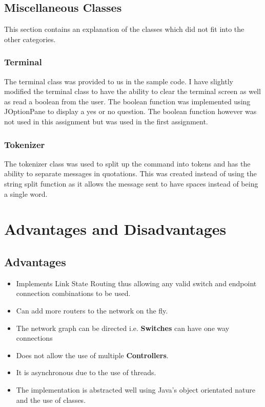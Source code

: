 \documentclass{article}
\begin{document}
\subsection{Miscellaneous Classes}
This section contains an explanation of the classes which did not fit into the
other categories.

\subsubsection{Terminal}
The terminal class was provided to us in the sample code. I have slightly
modified the terminal class to have the ability to clear the terminal screen
as well as read a boolean from the user. The boolean function was implemented
using JOptionPane to display a yes or no question. The boolean function however
was not used in this assignment but was used in the first assignment.

\subsubsection{Tokenizer}
The tokenizer class was used to split up the command into tokens and has the
ability to separate messages in quotations. This was created instead of using
the string split function as it allows the message sent to have spaces instead
of being a single word.

\section{Advantages and Disadvantages}
\subsection{Advantages}
\begin{itemize}
  \item{Implements Link State Routing thus allowing any valid switch and
    endpoint connection combinations to be used.}
  \item{Can add more routers to the network on the fly.}
  \item{The network graph can be directed i.e. \textbf{Switches} can have one
    way connections}
  \item{Does not allow the use of multiple \textbf{Controllers}.}
  \item{It is asynchronous due to the use of threads.}
  \item{The implementation is abstracted well using Java's object orientated
    nature and the use of classes.}
\end{itemize}
\end{document}
